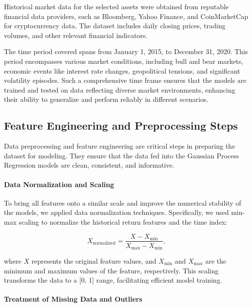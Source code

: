 Historical market data for the selected assets were obtained from reputable financial data providers, such as Bloomberg, Yahoo Finance, and CoinMarketCap for cryptocurrency data. The dataset includes daily closing prices, trading volumes, and other relevant financial indicators.

The time period covered spans from January 1, 2015, to December 31, 2020. This period encompasses various market conditions, including bull and bear markets, economic events like interest rate changes, geopolitical tensions, and significant volatility episodes. Such a comprehensive time frame ensures that the models are trained and tested on data reflecting diverse market environments, enhancing their ability to generalize and perform reliably in different scenarios.

\subsection{Feature Engineering and Preprocessing Steps}

Data preprocessing and feature engineering are critical steps in preparing the dataset for modeling. They ensure that the data fed into the Gaussian Process Regression models are clean, consistent, and informative.

\paragraph{Data Normalization and Scaling}

To bring all features onto a similar scale and improve the numerical stability of the models, we applied data normalization techniques. Specifically, we used min-max scaling to normalize the historical return features and the time index:

\begin{equation}
    X_{\text{normalized}} = \frac{X - X_{\text{min}}}{X_{\text{max}} - X_{\text{min}}},
\end{equation}

where $X$ represents the original feature values, and $X_{\text{min}}$ and $X_{\text{max}}$ are the minimum and maximum values of the feature, respectively. This scaling transforms the data to a [0, 1] range, facilitating efficient model training.

\paragraph{Treatment of Missing Data and Outliers}

